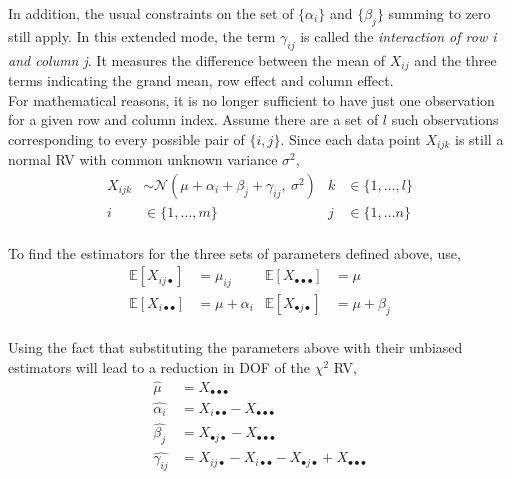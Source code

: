 In addition, the usual constraints on the set of $ \{\alpha_i\} $ and $ \{\beta_j\} $ summing to zero still apply. In this extended mode, the term $ \gamma_{ij} $ is called the \textit{interaction of row i and column j}. It measures the difference between the mean of $ X_{ij} $ and the three terms indicating the grand mean, row effect and column effect.\\

For mathematical reasons, it is no longer sufficient to have just one observation for a given row and column index. Assume there are a set of $ l $ such observations corresponding to every possible pair of $ \{i, j\} $. Since each data point $ X_{ijk} $ is still a normal RV with common unknown variance $ \sigma^2 $,\\

\begin{align}
	X_{ijk} &\sim \mathcal{N}(\mu + \alpha_i + \beta_j + \gamma_{ij},\ \sigma^2) & k &\in \{1, \dots, l\} \\
	i &\in \{1, \dots, m\} & j &\in \{1, \dots n\} \nonumber 
\end{align}\\

To find the estimators for the three sets of parameters defined above, use,\\

\begin{align}
	\mathbb{E}[X_{ij\bullet}] &= \mu_{ij} & \mathbb{E}[X_{\bullet \bullet \bullet}] &= \mu \\
	\mathbb{E}[X_{i\bullet \bullet}] &= \mu + \alpha_i & \mathbb{E}[X_{\bullet j \bullet}] &= \mu + \beta_j
\end{align}\\

Using the fact that substituting the parameters above with their unbiased estimators will lead to a reduction in DOF of the $ \chi^2 $ RV,\\

\begin{align}
	\widehat{\mu} &= X_{\bullet \bullet \bullet} \nonumber \\
	\widehat{\alpha_i} &= X_{i\bullet \bullet} - X_{\bullet \bullet \bullet} \nonumber \\
	\widehat{\beta_j} &= X_{\bullet j \bullet} - X_{\bullet \bullet \bullet} \nonumber \\
	\widehat{\gamma_{ij}} &= X_{ij\bullet} - X_{i\bullet \bullet} - X_{\bullet j \bullet} + X_{\bullet \bullet \bullet} 
\end{align}\\


